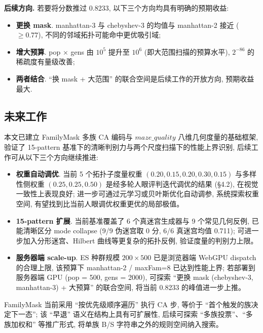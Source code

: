 \noindent\textbf{后续方向.} 若要将分数推过 0.8233, 以下三个方向均具有明确的预期收益:
\begin{itemize}[leftmargin=*, itemsep=0pt, topsep=0pt]
  \item \textbf{更换 mask}. manhattan-3 与 chebyshev-3 的均值与 manhattan-2 接近 ($\ge 0.77$), 不同的邻域拓扑可能命中更优吸引域;
  \item \textbf{增大预算}. pop $\times$ gens 由 $10^5$ 提升至 $10^6$ (即大范围扫描的预算水平), $2^{-86}$ 的稀疏度有量级改善;
  \item \textbf{两者结合}. ``换 mask + 大范围'' 的联合空间是后续工作的开放方向, 预期收益最大.
\end{itemize}

\subsection{未来工作}

本文已建立 FamilyMask 多族 CA 编码与 $maze\_quality$ 八维几何度量的基础框架, 验证了 15-pattern 基准下的清晰判别力与两个尺度扫描下的性能上界识别, 后续工作可从以下三个方向继续推进:

\begin{itemize}[leftmargin=*, itemsep=0pt, topsep=0pt]
  \item \textbf{权重自动调优}. 当前 5 个拓扑子度量权重 $(0.20, 0.15, 0.20, 0.30, 0.15)$ 与多样性侧权重 $(0.25, 0.25, 0.50)$ 是经多轮人眼评判迭代调优的结果 (§4.2), 在视觉一致性上表现良好; 进一步可通过元学习或贝叶斯优化自动调参, 系统探索权重空间, 有望找到比当前人眼调优权重更优的局部极值。
  \item \textbf{15-pattern 扩展}. 当前基准覆盖了 6 个真迷宫生成器与 9 个常见几何反例, 已能清晰区分 mode collapse (9/9 伪迷宫取 0 分, 6/6 真迷宫均值 0.711); 可进一步加入分形迷宫、Hilbert 曲线等更复杂的拓扑反例, 验证度量的判别力上限。
  \item \textbf{服务器端 scale-up}. ES 种群规模 $200 \times 500$ 已是浏览器端 WebGPU dispatch 的合理上限, 该预算下 manhattan-2 / maxFam=8 已达到性能上界; 若部署到服务器端 GPU (pop = 500, gens = 2000), 可探索 ``更换 mask (chebyshev-3, manhattan-3) + 大预算'' 的联合空间, 将当前 0.8233 的峰值进一步上推。
\end{itemize}

FamilyMask 当前采用 ``按优先级顺序遍历'' 执行 CA 步, 等价于 ``首个触发的族决定下一态''; 该 ``早退'' 语义在结构上具有可扩展性, 后续可探索 ``多族投票''、``多族加权和'' 等推广形式, 将单族 B/S 字符串之外的规则空间纳入搜索。
